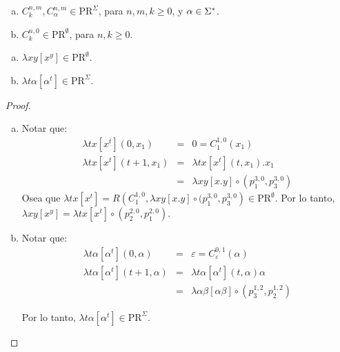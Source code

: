   \begin{lemma}
    \begin{enumerate}[a)]
      \item $C_{k}^{n,m}, C_{\alpha}^{n,m} \in \mathrm{PR}^{\Sigma}$, para $n, m, k \geq 0$, y $\alpha \in \Sigma^{\ast}$.
      \item $C_{k}^{n,0} \in \mathrm{PR}^{\emptyset}$, para $n, k \geq 0$.
    \end{enumerate}
  \end{lemma}

  \begin{lemma}
    \begin{enumerate}[a)]
      \item $\lambda xy \left[x^{y}\right] \in \mathrm{PR}^{\emptyset}$.
      \item $\lambda t\alpha \left[\alpha^{t}\right] \in \mathrm{PR}^{\Sigma}$.
    \end{enumerate}
  \end{lemma}
  \begin{proof}
    \begin{enumerate}[a)]
      \item Notar que:
        \begin{eqnarray*}
          \lambda tx \left[x^{t}\right](0, x_{1}) &=& 0 = C_{1}^{1,0}(x_{1}) \\
          \lambda tx \left[x^{t}\right](t+1, x_{1}) &=& \lambda tx \left[x^{t}\right](t, x_{1}) . x_{1} \\
          &=& \lambda xy \left[x.y\right] \circ (p_{1}^{3,0}, p_{3}^{3,0})
        \end{eqnarray*}
        \PN Osea que $\lambda tx \left[x^{t}\right] = R\left(C_{1}^{1,0}, \lambda xy \left[x.y\right] \circ
        (p_{1}^{3,0}, p_{3}^{3,0}\right) \in \mathrm{PR}^{\emptyset}$.
        \PN Por lo tanto, $\lambda xy \left[x^{y}\right] = \lambda tx \left[x^{t}\right] \circ (p_{2}^{2,0},
        p_{1}^{2,0})$.

      \item Notar que:
      \begin{eqnarray*}
        \lambda t\alpha \left[\alpha^{t}\right](0, \alpha) &=& \varepsilon = C_{\varepsilon}^{0,1}(\alpha) \\
        \lambda t\alpha \left[\alpha^{t}\right](t+1, \alpha) &=& \lambda t\alpha \left[\alpha^{t}\right](t,
          \alpha) \alpha \\
        &=& \lambda \alpha\beta \left[\alpha\beta \right] \circ \left(p_{3}^{1,2}, p_{2}^{1,2}\right)
      \end{eqnarray*}

      \PN Por lo tanto, $\lambda t\alpha \left[\alpha^{t}\right] \in \mathrm{PR}^{\Sigma}$.
    \end{enumerate}
  \end{proof}

